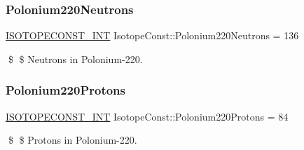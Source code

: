 \subsubsection{\texorpdfstring{Polonium220\+Neutrons}{Polonium220Neutrons}}
{\footnotesize\ttfamily \mbox{\hyperlink{group___isotope_const-_macros_ga5f18360b3e99483a35c32d789e62621c}{I\+S\+O\+T\+O\+P\+E\+C\+O\+N\+S\+T\+\_\+\+I\+NT}} Isotope\+Const\+::\+Polonium220\+Neutrons = 136}

\$ \$ Neutrons in Polonium-\/220. \mbox{\label{group___isotope_const-_polonium-_po220_ga7ac352d9704b8e505b5b5735f5b1e96a}} 
\subsubsection{\texorpdfstring{Polonium220\+Protons}{Polonium220Protons}}
{\footnotesize\ttfamily \mbox{\hyperlink{group___isotope_const-_macros_ga5f18360b3e99483a35c32d789e62621c}{I\+S\+O\+T\+O\+P\+E\+C\+O\+N\+S\+T\+\_\+\+I\+NT}} Isotope\+Const\+::\+Polonium220\+Protons = 84}

\$ \$ Protons in Polonium-\/220. 